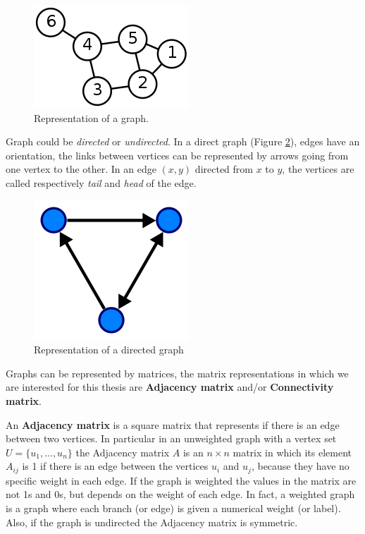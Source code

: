 \begin{figure}[htbp]
	\centering
	\includegraphics[scale=0.5]{Immagini/220px-6n-graf.svg.png}
	\caption{Representation of a graph.}
	\label{fig:diagram}
\end{figure}

Graph could be \textit{directed} or \textit{undirected}. In a direct graph (Figure  \ref{fig:diagram2}), edges have an orientation, the links between vertices can be represented by arrows going from one vertex to the other. In an edge $ (x,y) $ directed from $ x $ to $ y $, the vertices are called respectively \textit{tail} and \textit{head} of the edge.
\vspace{0.5cm}

\begin{figure}[htbp]
	\centering
	\includegraphics[scale=0.5]{Immagini/220px-Directed.svg.png}
	\caption{Representation of a directed graph}
	\label{fig:diagram2}
\end{figure}

Graphs can be represented by matrices, the matrix representations in which we are interested for this thesis are \textbf{Adjacency matrix} and/or \textbf{Connectivity matrix}. 
\vspace{0.5cm}

An \textbf{Adjacency matrix} is a square matrix that represents if there is an edge between two vertices. In particular in an unweighted graph with a vertex set $ U=\{u_{1}, ..., u_{n}\} $ the Adjacency matrix $ A $ is an $ n \times n $ matrix in which its element $ A_{ij} $ is 1 if there is an edge between the vertices $ u_{i} $ and $ u_{j} $, because they have no specific weight in each edge. If the graph is weighted the values in the matrix are not 1s and 0s, but depends on the weight of each edge. In fact, a weighted graph is a graph where each branch (or edge) is given a numerical weight (or label). Also, if the graph is undirected the Adjacency matrix is symmetric.


